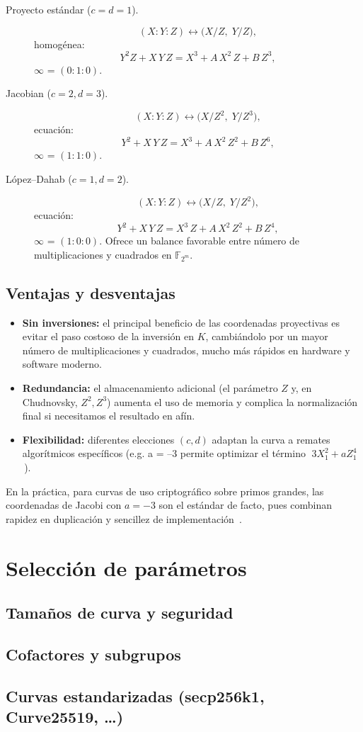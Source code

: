 \begin{description}
  \item[Proyecto estándar (\(c=d=1\)).]  
    \[
      (X:Y:Z)\longleftrightarrow\bigl(X/Z,\;Y/Z\bigr),
    \]
    homogénea:
    \[
      Y^2Z + X\,Y\,Z = X^3 + A\,X^2\,Z + B\,Z^3,
    \]
    ${\infty}$ = \((0:1:0)\).

  \item[Jacobian (\(c=2,d=3\)).]  
    \[
      (X:Y:Z)\longleftrightarrow\bigl(X/Z^2,\;Y/Z^3\bigr),
    \]
    ecuación:
    \[
      Y^2 + X\,Y\,Z = X^3 + A\,X^2\,Z^2 + B\,Z^6,
    \]
    ${\infty}$ = \((1:1:0)\).

  \item[López–Dahab (\(c=1,d=2\)).]  
    \[
      (X:Y:Z)\longleftrightarrow\bigl(X/Z,\;Y/Z^2\bigr),
    \]
    ecuación:
    \[
      Y^2 + X\,Y\,Z = X^3\,Z + A\,X^2\,Z^2 + B\,Z^4,
    \]
    ${\infty}$ = \((1:0:0)\).  
    Ofrece un balance favorable entre número de multiplicaciones y cuadrados en \(\mathbb{F}_{2^m}\).
\end{description}

\subsection{Ventajas y desventajas}

\begin{itemize}
  \item \textbf{Sin inversiones:} el principal beneficio de las coordenadas proyectivas es evitar el paso costoso de la inversión en \(K\), cambiándolo por un mayor número de multiplicaciones y cuadrados, mucho más rápidos en hardware y software moderno.
  \item \textbf{Redundancia:} el almacenamiento adicional (el parámetro \(Z\) y, en Chudnovsky, \(Z^2,Z^3\)) aumenta el uso de memoria y complica la normalización final si necesitamos el resultado en afín.
  \item \textbf{Flexibilidad:} diferentes elecciones \((c,d)\) adaptan la curva a remates algorítmicos específicos (e.g. a = –3 permite optimizar el término \(\;3X_1^2 + aZ_1^4\)\,).
\end{itemize}

En la práctica, para curvas de uso criptográfico sobre primos grandes, las coordenadas de Jacobi con \(a=-3\) son el estándar de facto, pues combinan rapidez en duplicación y sencillez de implementación~\cite{IEEE1363}.


\section{Selección de parámetros}
\subsection{Tamaños de curva y seguridad}
\subsection{Cofactores y subgrupos}
\subsection{Curvas estandarizadas (secp256k1, Curve25519, …)}